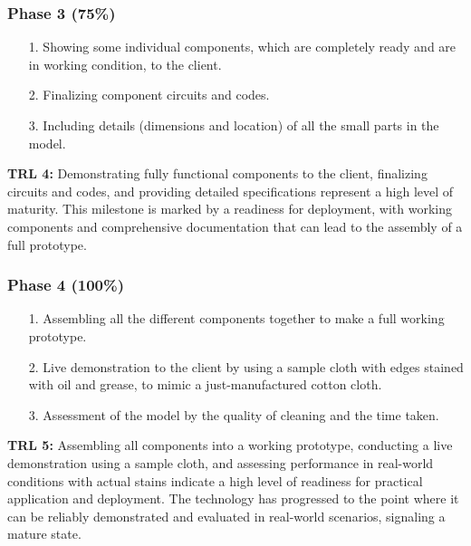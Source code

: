 \documentclass[table]{rapportCS}
\begin{document}
\subsubsection*{Phase 3 (75\%)}
\begin{enumerate}
    \item[1.] Showing some individual components, which are completely ready and are in working condition, to the client.
    \item[2.] Finalizing component circuits and codes.
    \item[3.] Including details (dimensions and location) of all the small parts in the model.
\end{enumerate}
\textbf{TRL 4:} Demonstrating fully functional components to the client, finalizing circuits and codes, and providing detailed specifications represent a high level of maturity. This milestone is marked by a readiness for deployment, with working components and comprehensive documentation that can lead to the assembly of a full prototype.

\subsubsection*{Phase 4 (100\%)}
\begin{enumerate}
    \item[1.] Assembling all the different components together to make a full working prototype.
    \item[2.] Live demonstration to the client by using a sample cloth with edges stained with oil and grease, to mimic a just-manufactured cotton cloth.
    \item[3.] Assessment of the model by the quality of cleaning and the time taken.
\end{enumerate}
\textbf{TRL 5:} Assembling all components into a working prototype, conducting a live demonstration using a sample cloth, and assessing performance in real-world conditions with actual stains indicate a high level of readiness for practical application and deployment. The technology has progressed to the point where it can be reliably demonstrated and evaluated in real-world scenarios, signaling a mature state.
\end{document}

